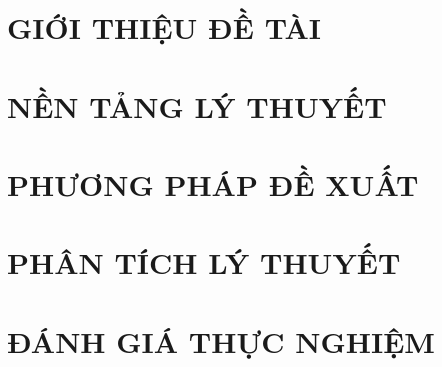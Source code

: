 \documentclass[a4paper,13pt,3p,twoside]{report}
\theoremstyle{definition}
\begin{document}
\renewcommand{\listtablename}{DANH MỤC BẢNG BIỂU}
{\let\oldnumberline\numberline
\renewcommand{\numberline}{Bảng~\oldnumberline}
\listoftables}

\glsaddall 
\renewcommand*{\acronymname}{DANH MỤC THUẬT NGỮ VÀ TỪ VIẾT TẮT}
\renewcommand*{\entryname}{Thuật ngữ}
\renewcommand*{\descriptionname}{Ý nghĩa}
\newpage
\printnoidxglossary[type=\acronymtype]


\renewcommand\appendixname{PHỤ LỤC}
\renewcommand\appendixpagename{PHỤ LỤC}
\renewcommand\appendixtocname{PHỤ LỤC}





\newpage
{}

\pagestyle{fancy}
\fancyhf{}
\fancyhead[RE, LO]{\leftmark}
\fancyfoot[RE, LO]{\thepage}

\chapter{GIỚI THIỆU ĐỀ TÀI}

\newpage
\chapter{NỀN TẢNG LÝ THUYẾT}



\newpage
\chapter{PHƯƠNG PHÁP ĐỀ XUẤT}


\newpage
\chapter{PHÂN TÍCH LÝ THUYẾT}


\newpage
\chapter{ĐÁNH GIÁ THỰC NGHIỆM}

\end{document}
